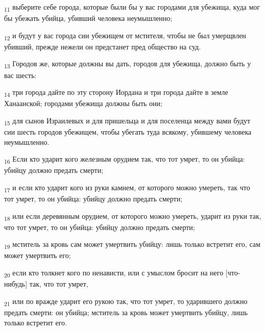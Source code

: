 \begin{tcolorbox}
\textsubscript{11} выберите себе города, которые были бы у вас городами для убежища, куда мог бы убежать убийца, убивший человека неумышленно;
\end{tcolorbox}
\begin{tcolorbox}
\textsubscript{12} и будут у вас города сии убежищем от мстителя, чтобы не был умерщвлен убивший, прежде нежели он предстанет пред общество на суд.
\end{tcolorbox}
\begin{tcolorbox}
\textsubscript{13} Городов же, которые должны вы дать, городов для убежища, должно быть у вас шесть:
\end{tcolorbox}
\begin{tcolorbox}
\textsubscript{14} три города дайте по эту сторону Иордана и три города дайте в земле Ханаанской; городами убежища должны быть они;
\end{tcolorbox}
\begin{tcolorbox}
\textsubscript{15} для сынов Израилевых и для пришельца и для поселенца между вами будут сии шесть городов убежищем, чтобы убегать туда всякому, убившему человека неумышленно.
\end{tcolorbox}
\begin{tcolorbox}
\textsubscript{16} Если кто ударит кого железным орудием так, что тот умрет, то он убийца: убийцу должно предать смерти;
\end{tcolorbox}
\begin{tcolorbox}
\textsubscript{17} и если кто ударит кого из руки камнем, от которого можно умереть, так что тот умрет, то он убийца: убийцу должно предать смерти;
\end{tcolorbox}
\begin{tcolorbox}
\textsubscript{18} или если деревянным орудием, от которого можно умереть, ударит из руки так, что тот умрет, то он убийца: убийцу должно предать смерти;
\end{tcolorbox}
\begin{tcolorbox}
\textsubscript{19} мститель за кровь сам может умертвить убийцу: лишь только встретит его, сам может умертвить его;
\end{tcolorbox}
\begin{tcolorbox}
\textsubscript{20} если кто толкнет кого по ненависти, или с умыслом бросит на него [что-нибудь] так, что тот умрет,
\end{tcolorbox}
\begin{tcolorbox}
\textsubscript{21} или по вражде ударит его рукою так, что тот умрет, то ударившего должно предать смерти: он убийца; мститель за кровь может умертвить убийцу, лишь только встретит его.
\end{tcolorbox}
